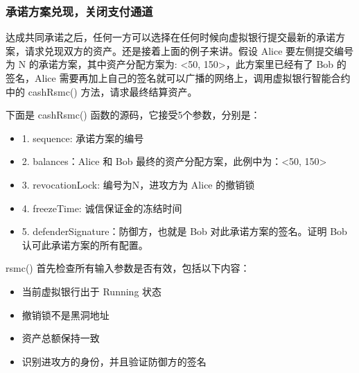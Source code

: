 \subsubsection{承诺方案兑现，关闭支付通道}
达成共同承诺之后，任何一方可以选择在任何时候向虚拟银行提交最新的承诺方案，请求兑现双方的资产。还是接着上面的例子来讲。假设 Alice 要左侧提交编号为 N 的承诺方案，其中资产分配方案为: <50, 150>，此方案里已经有了 Bob 的签名，Alice 需要再加上自己的签名就可以广播的网络上，调用虚拟银行智能合约中的 cashRsmc() 方法，请求最终结算资产。

下面是 cashRsmc() 函数的源码，它接受5个参数，分别是：
\begin{itemize}
    \item 1. sequence: 承诺方案的编号
    \item 2. balances：Alice 和 Bob 最终的资产分配方案，此例中为：<50, 150>
    \item 3. revocationLock: 编号为N，进攻方为 Alice 的撤销锁
    \item 4. freezeTime: 诚信保证金的冻结时间
    \item 5. defenderSignature：防御方，也就是 Bob 对此承诺方案的签名。证明 Bob 认可此承诺方案的所有配置。
\end{itemize}

rsmc() 首先检查所有输入参数是否有效，包括以下内容：

\begin{itemize}
    \item 当前虚拟银行出于 Running 状态
    \item 撤销锁不是黑洞地址
    \item 资产总额保持一致
    \item 识别进攻方的身份，并且验证防御方的签名
\end{itemize}

